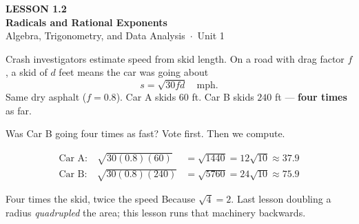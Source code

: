 \documentclass[aspectratio=169, 11pt]{beamer}
\begin{document}
{
\begin{frame}[plain]
  \vspace{2.8cm}\hspace{0.55cm}%
  \begin{minipage}{0.9\textwidth}
    {\color{goldacc}\bfseries\small LESSON 1.2}\\[0.5cm]
    {\color{white}\bfseries\LARGE Radicals and Rational Exponents}\\[1.2cm]
    {\color{mistmid}\small Algebra, Trigonometry, and Data Analysis~$\cdot$~Unit 1}
  \end{minipage}
\end{frame}
}

\begin{frame}[t, plain]
  Crash investigators estimate speed from skid length. On a road with drag factor $f$, a skid of
  $d$ feet means the car was going about
  \[ s = \sqrt{30fd} \quad \text{mph.} \]
  Same dry asphalt ($f=0.8$). Car A skids $60$ ft. Car B skids $240$ ft --- \textbf{four times}
  as far.
  \begin{block}{Was Car B going four times as fast?}
    Vote first. Then we compute.
  \end{block}
\end{frame}

\begin{frame}[t, plain]
  \[
  \begin{aligned}
    \text{Car A:} \quad \sqrt{30(0.8)(60)}  &= \sqrt{1440} = 12\sqrt{10} \approx 37.9 \\
    \text{Car B:} \quad \sqrt{30(0.8)(240)} &= \sqrt{5760} = 24\sqrt{10} \approx 75.9
  \end{aligned}
  \]
  \begin{block}{Four times the skid, twice the speed}
    Because $\sqrt{4}=2$. Last lesson doubling a radius \emph{quadrupled} the area; this lesson
    runs that machinery backwards.
  \end{block}
\end{frame}
\end{document}
